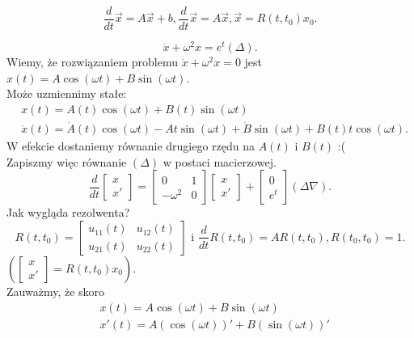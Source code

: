 \documentclass[../main.tex]{subfiles}
\begin{document}
        \[
            \frac{d}{dt}\vec{x} = A \vec{x} + b, \frac{d}{dt} \vec{x} = A \vec{x}, \vec{x} = R(t,t_0)x_0
        .\]
        \begin{przyklad}
            \[
                \ddot{x} + \omega^2 x = e^t (\Delta)
            .\]
            Wiemy, że rozwiązaniem problemu $\ddot{x} + \omega^2 x = 0$ jest $x(t) = A \cos(\omega t) + B \sin(\omega t)$.\\
            Może uzmiennimy stałe:
            \begin{align*}
                &x(t) = A(t) \cos(\omega t) + B(t) \sin(\omega t)\\
                &\dot{x}(t) = \dot{A}(t) \cos(\omega t) - A t \sin (\omega t) + \dot{B} \sin(\omega t) + B(t) t \cos(\omega t)
            .\end{align*}
            W efekcie dostaniemy równanie drugiego rzędu na $A(t)$ i $B(t)$ :(\\
            Zapiszmy więc równanie $(\Delta)$ w postaci macierzowej.
            \[
                \frac{d}{dt}\begin{bmatrix} x\\x' \end{bmatrix} = \begin{bmatrix} 0&1\\-\omega^2&0 \end{bmatrix} \begin{bmatrix} x\\x' \end{bmatrix} + \begin{bmatrix} 0\\e^t \end{bmatrix} (\Delta\nabla)
            .\]
            Jak wygląda rezolwenta?
            \[
                R(t,t_0) = \begin{bmatrix} u_{11}(t)&u_{12}(t)\\ u_{21}(t) & u_{22}(t) \end{bmatrix} \text{ i } \frac{d}{dt}R(t,t_0) = A R(t,t_0), R(t_0,t_0) = 1
            .\]
            $\left(\begin{bmatrix} x\\x' \end{bmatrix} = R(t,t_0)x_0 \right)$.\\
            Zauważmy, że skoro
            \begin{align*}
                &x(t) = A\cos(\omega t) + B \sin(\omega t)\\
                &x'(t) = A\left( \cos(\omega t) \right)' + B\left( \sin(\omega t) \right)'\\

\end{align*}
\end{przyklad}
\end{document}
